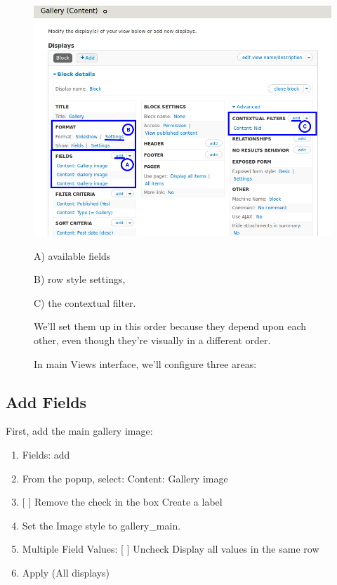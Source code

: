 \documentclass[letterpaper,10pt,english]{sphinxmanual}
\begin{document}
\begin{figure}[htbp]
\centering
\capstart

\includegraphics[width=0.650\linewidth]{slideshows-gallery.png}
\caption{In main Views interface, we'll configure three areas:}{\small 
\begin{DUlineblock}{0em}
\item[] A) available fields
\item[] B) row style settings,
\item[] C) the contextual filter.
\end{DUlineblock}

We’ll set them up in this order because they depend upon each other, even though they’re visually in a different order.
}\end{figure}


\subsection{Add Fields}
\label{slideshows:add-fields}
First, add the main gallery image:
\begin{enumerate}
\item {} 
Fields: add

\item {} 
From the popup, select: Content: Gallery image

\item {} 
{[} {]} Remove the check in the box Create a label

\item {} 
Set the Image style to gallery\_main.

\item {} 
Multiple Field Values: {[} {]} Uncheck Display all values in the same row

\item {} 
Apply (All displays)

\end{enumerate}
\end{document}
